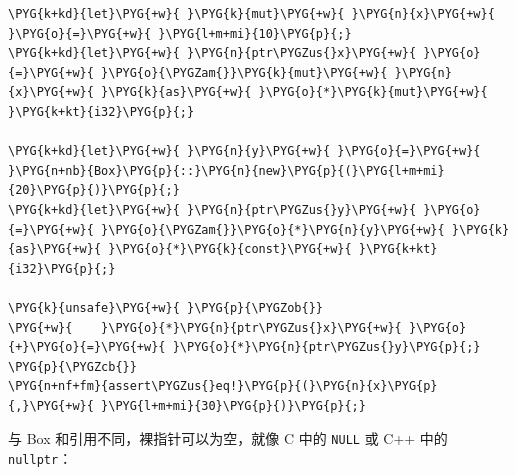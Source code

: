 \begin{Verbatim}[commandchars=\\\{\},breaklines=true,breakanywhere=true,fontsize=\codefont,xleftmargin=17bp]
\PYG{k+kd}{let}\PYG{+w}{ }\PYG{k}{mut}\PYG{+w}{ }\PYG{n}{x}\PYG{+w}{ }\PYG{o}{=}\PYG{+w}{ }\PYG{l+m+mi}{10}\PYG{p}{;}
\PYG{k+kd}{let}\PYG{+w}{ }\PYG{n}{ptr\PYGZus{}x}\PYG{+w}{ }\PYG{o}{=}\PYG{+w}{ }\PYG{o}{\PYGZam{}}\PYG{k}{mut}\PYG{+w}{ }\PYG{n}{x}\PYG{+w}{ }\PYG{k}{as}\PYG{+w}{ }\PYG{o}{*}\PYG{k}{mut}\PYG{+w}{ }\PYG{k+kt}{i32}\PYG{p}{;}

\PYG{k+kd}{let}\PYG{+w}{ }\PYG{n}{y}\PYG{+w}{ }\PYG{o}{=}\PYG{+w}{ }\PYG{n+nb}{Box}\PYG{p}{::}\PYG{n}{new}\PYG{p}{(}\PYG{l+m+mi}{20}\PYG{p}{)}\PYG{p}{;}
\PYG{k+kd}{let}\PYG{+w}{ }\PYG{n}{ptr\PYGZus{}y}\PYG{+w}{ }\PYG{o}{=}\PYG{+w}{ }\PYG{o}{\PYGZam{}}\PYG{o}{*}\PYG{n}{y}\PYG{+w}{ }\PYG{k}{as}\PYG{+w}{ }\PYG{o}{*}\PYG{k}{const}\PYG{+w}{ }\PYG{k+kt}{i32}\PYG{p}{;}

\PYG{k}{unsafe}\PYG{+w}{ }\PYG{p}{\PYGZob{}}
\PYG{+w}{    }\PYG{o}{*}\PYG{n}{ptr\PYGZus{}x}\PYG{+w}{ }\PYG{o}{+}\PYG{o}{=}\PYG{+w}{ }\PYG{o}{*}\PYG{n}{ptr\PYGZus{}y}\PYG{p}{;}
\PYG{p}{\PYGZcb{}}
\PYG{n+nf+fm}{assert\PYGZus{}eq!}\PYG{p}{(}\PYG{n}{x}\PYG{p}{,}\PYG{+w}{ }\PYG{l+m+mi}{30}\PYG{p}{)}\PYG{p}{;}
\end{Verbatim}

与 Box 和引用不同，裸指针可以为空，就像 C 中的 \texttt{NULL} 或 C++ 中的 \texttt{nullptr}：

